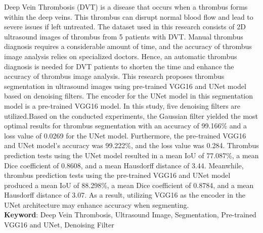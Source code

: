 \begin{spacing}{1}
	
Deep Vein Thrombosis (DVT) is a disease that occurs when a thrombus forms within the deep veins. This thrombus can disrupt normal blood flow and lead to severe issues if left untreated. The dataset used in this research consists of 2D ultrasound images of thrombus from 5 patients with DVT. Manual thrombus diagnosis requires a considerable amount of time, and the accuracy of thrombus image analysis relies on specialized doctors. Hence, an automatic thrombus diagnosis is needed for DVT patients to shorten the time and enhance the accuracy of thrombus image analysis. This research proposes thrombus segmentation in ultrasound images using pre-trained VGG16 and UNet model based on denoising filters. The encoder for the UNet model in this segmentation model is a pre-trained VGG16 model. In this study, five denoising filters are utilized.Based on the conducted experiments, the Gaussian filter yielded the most optimal results for thrombus segmentation with an accuracy of 99.166\% and a loss value of 0.0269 for the UNet model. Furthermore, the pre-trained VGG16 and UNet model's accuracy was 99.222\%, and the loss value was 0.284. Thrombus prediction tests using the UNet model resulted in a mean IoU of 77.087\%, a mean Dice coefficient of 0.8608, and a mean Hausdorff distance of 3.44. Meanwhile, thrombus prediction tests using the pre-trained VGG16 and UNet model produced a mean IoU of 88.298\%, a mean Dice coefficient of 0.8784, and a mean Hausdorff distance of 3.07. As a result, utilizing VGG16 as the encoder in the UNet architecture may enhance accuracy when segmenting. \\

\vspace{2ex}
\textbf{Keyword}: Deep Vein Thrombosis,  Ultrasound Image, Segmentation, Pre-trained VGG16 and UNet, Denoising Filter
\end{spacing}